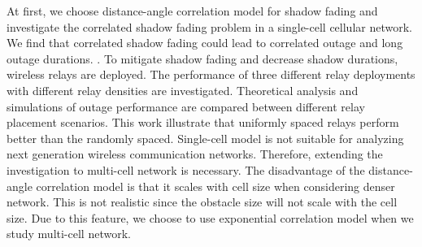 \par At first, we choose distance-angle correlation model for shadow fading and investigate the correlated shadow fading problem in a single-cell cellular network. We find that correlated shadow fading could lead to correlated outage and long outage durations. . To mitigate shadow fading and decrease shadow durations, wireless relays are deployed. The performance of three different relay deployments with different relay densities are investigated. Theoretical analysis and simulations of outage performance are compared between different relay placement scenarios. \cite{The following sentence seems from your paper,  you should change it since this is the intro of dissertation}This work illustrate that uniformly spaced relays perform better than the randomly spaced. Single-cell model is not suitable for analyzing next generation wireless communication networks. Therefore, extending the investigation to multi-cell network is necessary. The disadvantage of the distance-angle correlation model is that it scales with cell size when considering denser network. This is not realistic since the obstacle size will not scale with the cell size. Due to this feature, we choose to use exponential correlation model when we study multi-cell network. 

